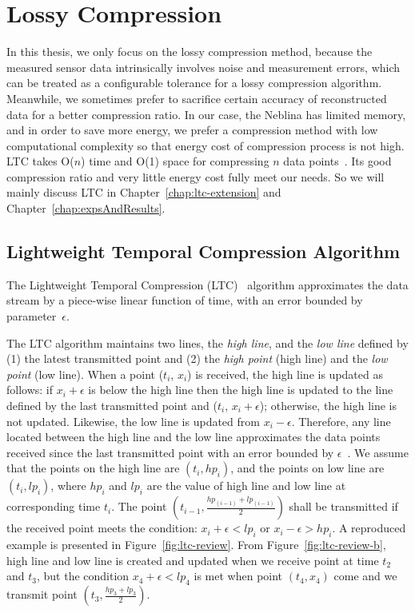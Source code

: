 \section{Lossy Compression}
\label{sec:lossy}

In this thesis, we only focus on the lossy compression method, because  the
measured sensor data intrinsically involves noise and measurement errors, which
can be treated as a configurable tolerance for a lossy compression algorithm.
Meanwhile, we sometimes prefer to sacrifice certain accuracy of reconstructed
data for a better compression ratio. In our case, the Neblina has limited
memory, and in order to save more energy, we prefer a compression method with
low computational complexity so that energy cost of compression process is not
high. LTC takes O($n$) time and O(1) space for compressing $n$ data
points~\cite{schoellhammer2004lightweight}. Its good compression ratio and very
little energy cost fully meet our needs. So we will mainly discuss LTC in
Chapter~\ref{chap:ltc-extension} and Chapter~\ref{chap:expsAndResults}.

\subsection{Lightweight Temporal Compression Algorithm}
\label{sec:ltc}

The Lightweight Temporal Compression (LTC)~\cite{schoellhammer2004lightweight}
algorithm approximates the data stream by a piece-wise linear function of time,
with an error bounded by parameter~$\epsilon$.

The LTC algorithm maintains two lines, the \emph{high line}, and the \emph{low
line} defined by (1) the latest transmitted point and (2) the \emph{high point}
(high line) and the \emph{low point} (low line). When a point ($t_i$, $x_i$) is
received, the high line is updated as follows: if $x_i+\epsilon$ is below the
high line then the high line is updated to the line defined by the last
transmitted point and ($t_i$, $x_i+\epsilon$); otherwise, the high line is not
updated. Likewise, the low line is updated from $x_i-\epsilon$. Therefore, any
line located between the high line and the low line approximates the data points
received since the last transmitted point with an error bounded by
$\epsilon$~\cite{schoellhammer2004lightweight}. We assume that the points on the high
line are $(t_i, hp_i)$, and the points on low line are $(t_i, lp_i)$, where
$hp_i$ and $lp_i$ are the value of high line and low line at corresponding time
$t_i$.
The point $(t_{i-1}, \frac{hp_{(i-1)}+lp_{(i-1)}}{2})$ shall be transmitted if the
received point meets the condition: $x_i+\epsilon < lp_{i}$ or $x_i-\epsilon >
hp_{i}$. A reproduced example is presented in Figure~\ref{fig:ltc-review}. From
Figure~\ref{fig:ltc-review-b}, high line and low line is created and updated
when we receive point at time $t_2$ and $t_3$, but the condition $x_4+\epsilon <
lp_{4}$ is met when point $(t_4, x_4)$ come and we transmit point $(t_3,
\frac{hp_{3}+lp_{3}}{2})$. 

